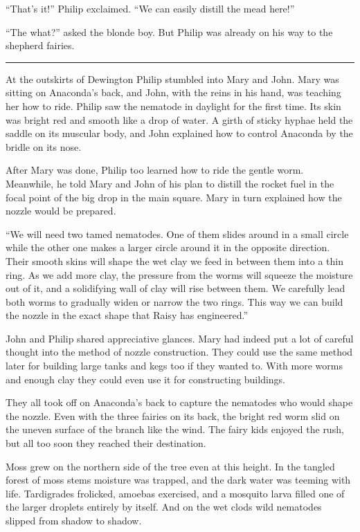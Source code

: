 \documentclass[10pt, draft]{memoir}
\renewcommand{\pfbreakdisplay}{\bigskip \ding{166} \bigskip}
\newcommand{\secbreak}{\fancybreak{\pfbreakdisplay}}
\begin{document}
``That's it!'' Philip exclaimed. ``We can easily distill the mead here!''

``The what?'' asked the blonde boy. But Philip was already on his way to the
shepherd fairies.

\secbreak

At the outskirts of Dewington Philip stumbled into Mary and John. Mary was
sitting on Anaconda's back, and John, with the reins in his hand, was teaching
her how to ride. Philip saw the nematode in daylight for the first time. Its
skin was bright red and smooth like a drop of water. A girth of sticky hyphae
held the saddle on its muscular body, and John explained how to control
Anaconda by the bridle on its nose.

After Mary was done, Philip too learned how to ride the gentle worm. Meanwhile,
he told Mary and John of his plan to distill the rocket fuel in the focal point
of the big drop in the main square. Mary in turn explained how the nozzle would
be prepared.

``We will need two tamed nematodes. One of them slides around in a small circle
while the other one makes a larger circle around it in the opposite direction.
Their smooth skins will shape the wet clay we feed in between them into a thin
ring. As we add more clay, the pressure from the worms will squeeze the
moisture out of it, and a solidifying wall of clay will rise between them. We
carefully lead both worms to gradually widen or narrow the two rings. This way
we can build the nozzle in the exact shape that Raisy has engineered.''

John and Philip shared appreciative glances. Mary had indeed put a lot of
careful thought into the method of nozzle construction. They could use the same
method later for building large tanks and kegs too if they wanted to. With more
worms and enough clay they could even use it for constructing buildings.

They all took off on Anaconda's back to capture the nematodes who would shape
the nozzle. Even with the three fairies on its back, the bright red worm slid
on the uneven surface of the branch like the wind. The fairy kids enjoyed the
rush, but all too soon they reached their destination.

Moss grew on the northern side of the tree even at this height. In the tangled
forest of moss stems moisture was trapped, and the dark water was teeming with
life. Tardigrades frolicked, amoebas exercised, and a mosquito larva filled one
of the larger droplets entirely by itself. And on the wet clods wild nematodes
slipped from shadow to shadow.
\end{document}
